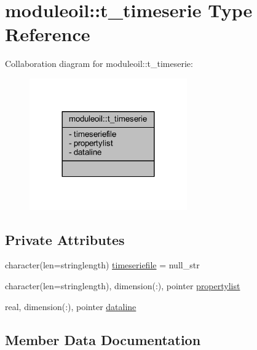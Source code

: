 \hypertarget{structmoduleoil_1_1t__timeserie}{}\section{moduleoil\+:\+:t\+\_\+timeserie Type Reference}
\label{structmoduleoil_1_1t__timeserie}


Collaboration diagram for moduleoil\+:\+:t\+\_\+timeserie\+:\nopagebreak
\begin{figure}[H]
\begin{center}
\leavevmode
\includegraphics[width=192pt]{structmoduleoil_1_1t__timeserie__coll__graph}
\end{center}
\end{figure}
\subsection*{Private Attributes}
\begin{DoxyCompactItemize}
\item 
character(len=stringlength) \mbox{\hyperlink{structmoduleoil_1_1t__timeserie_a980716d2f12644150d2b4404d25efe8e}{timeseriefile}} = null\+\_\+str
\item 
character(len=stringlength), dimension(\+:), pointer \mbox{\hyperlink{structmoduleoil_1_1t__timeserie_a87e0468439878dc36a1d2ae4329b996a}{propertylist}}
\item 
real, dimension(\+:), pointer \mbox{\hyperlink{structmoduleoil_1_1t__timeserie_a1501eb40260bd0506382946657139c87}{dataline}}
\end{DoxyCompactItemize}


\subsection{Member Data Documentation}
\mbox{\label{structmoduleoil_1_1t__timeserie_a1501eb40260bd0506382946657139c87}} 
